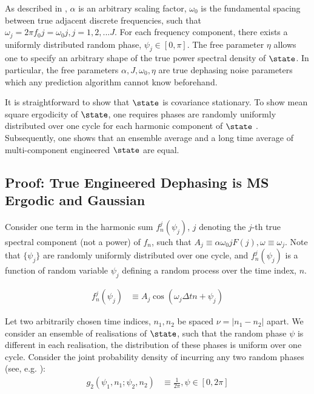 As described in \cite{soare2014}, $\alpha$ is an arbitrary scaling factor, $\omega_0$ is the fundamental spacing between true adjacent discrete frequencies, such that $\omega_j = 2 \pi f_0 j =\omega_0 j, j = 1, 2, ...J$. For each frequency component, there exists a uniformly distributed random phase, $\psi_j \in [0, \pi]$. The free parameter $\eta$ allows one to specify an arbitrary shape of the true power spectral density of $\state$. In particular, the free parameters $\alpha, J, \omega_0, \eta$ are true dephasing noise parameters which any prediction algorithm cannot know beforehand.

It is straightforward to show that $\state$ is covariance stationary. To show mean square ergodicity of $\state$, one requires phases are randomly uniformly distributed over one cycle for each harmonic component of $\state$ \cite{gelb1974applied}. Subsequently, one shows that an ensemble average and a long time average of multi-component engineered $\state$ are equal. 

\subsection{Proof: True Engineered Dephasing is MS Ergodic and Gaussian}

Consider one term in the harmonic sum $f^j_n(\psi_j)$, $j$ denoting the $j$-th true spectral component (not a power) of $f_n$, such that $A_j \equiv \alpha \omega_0 j F(j), \omega \equiv \omega_j$. Note that $\{ \psi_j \}$ are randomly uniformly distributed over one cycle, and $f^j_n(\psi_j)$ is a function of random variable $\psi_j$ defining a random process over the time index, $n$. 

\begin{align}
f^j_n(\psi_j) & \equiv A_j \cos(\omega_j \Delta t n + \psi_j ) 
\end{align}

Let two arbitrarily chosen time indices, $n_1, n_2$ be spaced $\nu = |n_1 - n_2|$ apart. We consider an ensemble of realisations of $\state$, such that the random phase $\psi$ is different in each realisation, the distribution of these phases is uniform over one cycle. Consider the joint probability density of incurring any two random phases (see, e.g. \cite{gelb1974applied}):
\begin{align}
g_2(\psi_1, n_1; \psi_2, n_2) & \equiv \frac{1}{2\pi}, \psi \in [0, 2\pi] \label{eqn:SS_ensble_prob_density} \\
\end{align}

